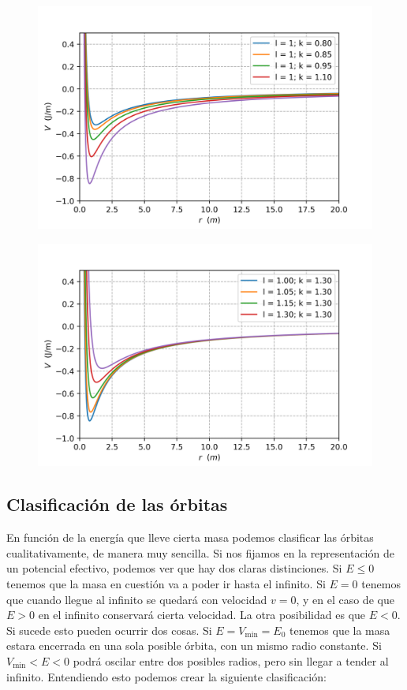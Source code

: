 \documentclass[12pt,a4paper]{book}
\begin{document}
\begin{figure}[h!] \centering
\includegraphics[scale=0.8]{gravedad_k.png}
\end{figure}

\begin{figure}[h!] \centering
\includegraphics[scale=0.8]{gravedad_l.png}
\end{figure}


\subsection{Clasificación de las órbitas}

En función de la energía que lleve cierta masa podemos clasificar las órbitas cualitativamente, de manera muy sencilla. Si nos fijamos en la representación de un potencial efectivo, podemos ver que hay dos claras distinciones. Si $E \leq 0$ tenemos que la masa en cuestión va a poder ir hasta el infinito. Si $E=0$ tenemos que cuando llegue al infinito se quedará con velocidad $v=0$, y en el caso de que $E>0$ en el infinito conservará cierta velocidad. La otra posibilidad es que $E<0$. Si sucede esto pueden ocurrir dos cosas. Si $E=V_{\mathrm{min}}=E_0$ tenemos que la masa estara encerrada en una sola posible órbita, con un mismo radio constante. Si $V_{\mathrm{min}}<E<0$ podrá oscilar entre dos posibles radios, pero sin llegar a tender al infinito. Entendiendo esto podemos crear la siguiente clasificación:
\end{document}
